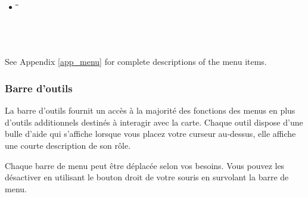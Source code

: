 \begin{itemize}
\item {}
\begin{tabbing}
\hspace{4.5cm}\=\hspace{3cm}\=\hspace{3.5cm}\= \kill
{}
 \> 
 \>            
 \> \\
 \> 
 \>           
 \\
 \\
 \\
\end{tabbing}

\end{itemize}

See Appendix \ref{app_menu} for complete descriptions of the menu items.

\subsubsection{Barre d'outils}\label{label_toolbars}

%

La barre d'outils fournit un acc\`es \`a la majorit\'e des fonctions des menus en plus d'outils additionnels destin\'es \`a interagir avec la carte. Chaque outil dispose d'une bulle d'aide qui s'affiche lorsque vous placez votre curseur au-dessus, elle affiche une courte description de son r\^ole.

Chaque barre de menu peut \^etre d\'eplac\'ee selon vos besoins. Vous pouvez les d\'esactiver en utilisant le bouton droit de votre souris en survolant la barre de menu.

%

